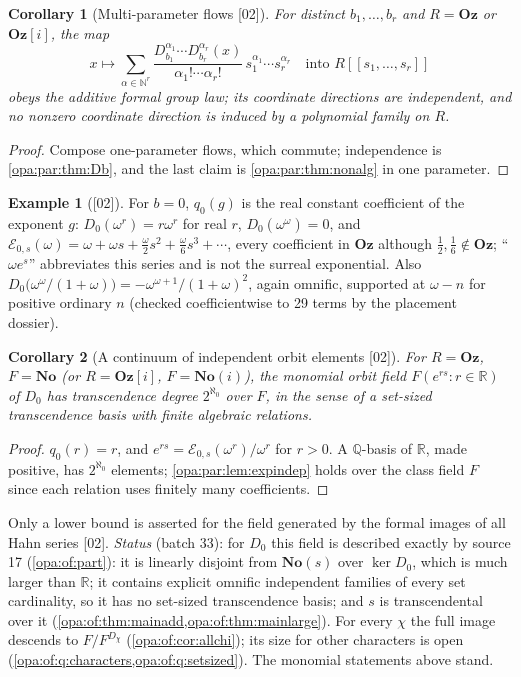 \documentclass[11pt,oneside]{article}
\numberwithin{equation}{section}
\newtheorem{corollary}[corollary]{Corollary}
\theoremstyle{definition}
\newtheorem{example}[example]{Example}
\theoremstyle{remark}
\newcommand{\No}{\mathbf{No}}
\newcommand{\Oz}{\mathbf{Oz}}
\newcommand{\Og}{\mathbf{Oz}[i]}
\newcommand{\SC}{\mathbf{No}(i)}
\newcommand{\R}{\mathbb R}
\newcommand{\Q}{\mathbb Q}
\newcommand{\N}{\mathbb N}
\newcommand{\EE}{\mathcal E}
\newcommand{\src}[1]{\textup{\textsf{\small[#1]}}}
\begin{document}
\begin{corollary}[Multi-parameter flows \src{02}]\label{opa:par:cor:multiflow}
For distinct $b_1,\dots,b_r$ and $R=\Oz$ or $\Og$, the map
\[
 x\longmapsto\sum_{\alpha\in\N^r}\frac{D_{b_1}^{\alpha_1}\cdots D_{b_r}^{\alpha_r}(x)}
 {\alpha_1!\cdots\alpha_r!}\,s_1^{\alpha_1}\cdots s_r^{\alpha_r}
 \quad\text{into }R[[s_1,\dots,s_r]]
\]
obeys the additive formal group law; its coordinate directions are independent, and no nonzero
coordinate direction is induced by a polynomial family on $R$.
\end{corollary}
\begin{proof}
Compose one-parameter flows, which commute; independence is \cref{opa:par:thm:Db}, and
the last claim is \cref{opa:par:thm:nonalg} in one parameter.
\end{proof}

\begin{example}[\src{02}]\label{opa:par:ex:flow}
For $b=0$, $q_0(g)$ is the real constant coefficient of the exponent $g$:
$D_0(\omega^r)=r\omega^r$ for real $r$, $D_0(\omega^\omega)=0$, and
$\EE_{0,s}(\omega)=\omega+\omega s+\frac\omega2s^2+\frac\omega6s^3+\cdots$, every coefficient in
$\Oz$ although $\frac12,\frac16\notin\Oz$; ``$\omega e^s$'' abbreviates this series and is
not the surreal exponential. Also
$D_0\bigl(\omega^\omega/(1+\omega)\bigr)=-\omega^{\omega+1}/(1+\omega)^2$, again omnific, supported at
$\omega-n$ for positive ordinary $n$ (checked coefficientwise to 29 terms by the
placement dossier).
\end{example}

\begin{corollary}[A continuum of independent orbit elements \src{02}]\label{opa:par:cor:continuum}
For $R=\Oz$, $F=\No$ (or $R=\Og$, $F=\SC$), the monomial orbit field $F(e^{rs}:r\in\R)$
of $D_0$ has transcendence degree $2^{\aleph_0}$ over $F$, in the sense of a set-sized
transcendence basis with finite algebraic relations.
\end{corollary}
\begin{proof}
$q_0(r)=r$, and $e^{rs}=\EE_{0,s}(\omega^r)/\omega^r$ for $r>0$. A $\Q$-basis of $\R$, made
positive, has $2^{\aleph_0}$ elements; \cref{opa:par:lem:expindep} holds over the class
field $F$ since each relation uses finitely many coefficients.
\end{proof}

Only a lower bound is asserted for the field generated by the formal images of all
Hahn series \src{02}. \emph{Status} (batch 33): for $D_0$ this field is described exactly by
source 17 (\cref{opa:of:part}): it is linearly disjoint from $\No(s)$ over $\ker D_0$, which is
much larger than $\R$; it contains explicit omnific independent families of every set
cardinality, so it has no set-sized transcendence basis; and $s$ is transcendental over it
(\cref{opa:of:thm:mainadd,opa:of:thm:mainlarge}). For every $\chi$ the full image descends to
$F/F^{D_\chi}$ (\cref{opa:of:cor:allchi}); its size for other characters is open
(\cref{opa:of:q:characters,opa:of:q:setsized}). The monomial statements above stand.
\end{document}
